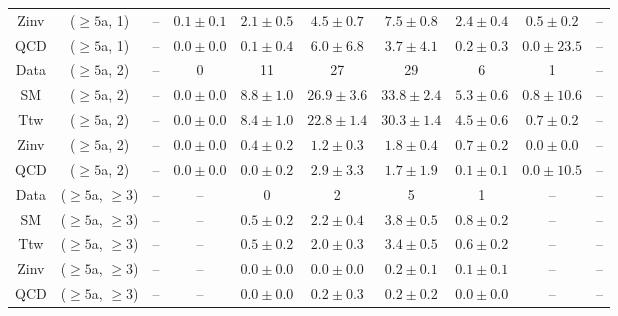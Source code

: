 \begin{table}[h!]
{\begin{tabular}{cccccccccc}
	Zinv & ($\ge5$a, 1) & -- & $0.1\pm 0.1$ & $2.1\pm 0.5$ & $4.5\pm 0.7$ & $7.5\pm 0.8$ & $2.4\pm 0.4$ & $0.5\pm 0.2$ & -- \\[0.5ex] 
	QCD & ($\ge5$a, 1) & -- & $0.0\pm 0.0$ & $0.1\pm 0.4$ & $6.0\pm 6.8$ & $3.7\pm 4.1$ & $0.2\pm 0.3$ & $0.0\pm 23.5$ & -- \\[0.5ex] 
	Data & ($\ge5$a, 2) & -- & 0 & 11 & 27 & 29 & 6 & 1 & -- \\[0.5ex] 
	SM & ($\ge5$a, 2) & -- & $0.0\pm 0.0$ & $8.8\pm 1.0$ & $26.9\pm 3.6$ & $33.8\pm 2.4$ & $5.3\pm 0.6$ & $0.8\pm 10.6$ & -- \\[0.5ex] 
	Ttw & ($\ge5$a, 2) & -- & $0.0\pm 0.0$ & $8.4\pm 1.0$ & $22.8\pm 1.4$ & $30.3\pm 1.4$ & $4.5\pm 0.6$ & $0.7\pm 0.2$ & -- \\[0.5ex] 
	Zinv & ($\ge5$a, 2) & -- & $0.0\pm 0.0$ & $0.4\pm 0.2$ & $1.2\pm 0.3$ & $1.8\pm 0.4$ & $0.7\pm 0.2$ & $0.0\pm 0.0$ & -- \\[0.5ex] 
	QCD & ($\ge5$a, 2) & -- & $0.0\pm 0.0$ & $0.0\pm 0.2$ & $2.9\pm 3.3$ & $1.7\pm 1.9$ & $0.1\pm 0.1$ & $0.0\pm 10.5$ & -- \\[0.5ex] 
	Data & ($\ge5$a, $\ge3$) & -- & -- & 0 & 2 & 5 & 1 & -- & -- \\[0.5ex] 
	SM & ($\ge5$a, $\ge3$) & -- & -- & $0.5\pm 0.2$ & $2.2\pm 0.4$ & $3.8\pm 0.5$ & $0.8\pm 0.2$ & -- & -- \\[0.5ex] 
	Ttw & ($\ge5$a, $\ge3$) & -- & -- & $0.5\pm 0.2$ & $2.0\pm 0.3$ & $3.4\pm 0.5$ & $0.6\pm 0.2$ & -- & -- \\[0.5ex] 
	Zinv & ($\ge5$a, $\ge3$) & -- & -- & $0.0\pm 0.0$ & $0.0\pm 0.0$ & $0.2\pm 0.1$ & $0.1\pm 0.1$ & -- & -- \\[0.5ex] 
	QCD & ($\ge5$a, $\ge3$) & -- & -- & $0.0\pm 0.0$ & $0.2\pm 0.3$ & $0.2\pm 0.2$ & $0.0\pm 0.0$ & -- & -- \\[0.5ex] 
	\hline
	\hline
\end{tabular}}
\end{table}
